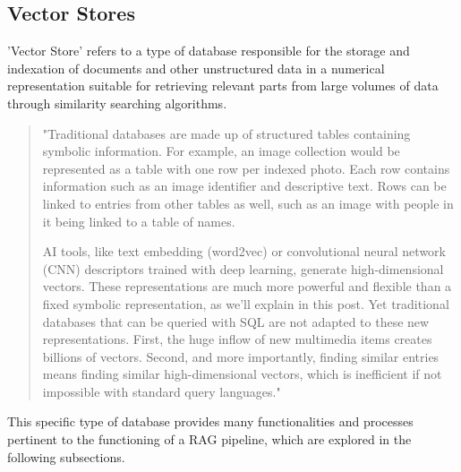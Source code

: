 \subsection{Vector Stores}
'Vector Store' refers to a type of database responsible for the storage and indexation of documents and other unstructured data in a numerical representation suitable for retrieving relevant parts from large volumes of data through similarity searching algorithms.
\begin{quote}
    "Traditional databases are made up of structured tables containing symbolic information. For example, an image collection would be represented as a table with one row per indexed photo. Each row contains information such as an image identifier and descriptive text. Rows can be linked to entries from other tables as well, such as an image with people in it being linked to a table of names.

    AI tools, like text embedding (word2vec) or convolutional neural network (CNN) descriptors trained with deep learning, generate high-dimensional vectors. These representations are much more powerful and flexible than a fixed symbolic representation, as we’ll explain in this post. Yet traditional databases that can be queried with SQL are not adapted to these new representations. First, the huge inflow of new multimedia items creates billions of vectors. Second, and more importantly, finding similar entries means finding similar high-dimensional vectors, which is inefficient if not impossible with standard query languages."  \cite{faissess}
\end{quote}
This specific type of database provides many functionalities and processes pertinent to the functioning of a RAG pipeline, which are explored in the following subsections.
